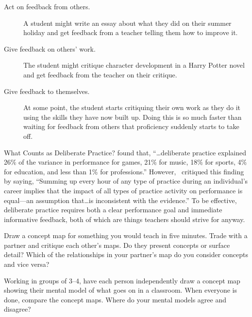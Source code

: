 \begin{description}

\item[Act on feedback from others.]
  A student might write an essay about what they did on their summer holiday
  and get feedback from a teacher telling them how to improve it.

\item[Give feedback on others' work.]
  The student might critique character development in a Harry Potter novel
  and get feedback from the teacher on their critique.

\item[Give feedback to themselves.]
  At some point,
  the student starts critiquing their own work as they do it
  using the skills they have now built up.
  Doing this is so much faster than waiting for feedback from others
  that proficiency suddenly starts to take off.

\end{description}

\begin{aside}{What Counts as Deliberate Practice?}
  \cite{Macn2014} found that,
  ``{\ldots}deliberate practice explained 26\% of the variance in performance for games,
  21\% for music,
  18\% for sports,
  4\% for education,
  and less than 1\% for professions.''
  However,~\cite{Eric2016} critiqued this finding by saying,
  ``Summing up every hour of any type of practice during an individual's career
  implies that the impact of all types of practice activity on performance is equal---an assumption
  that{\ldots}is inconsistent with the evidence.''
  To be effective,
  deliberate practice requires both a clear performance goal
  and immediate informative feedback,
  both of which are things teachers should strive for anyway.
\end{aside}



Draw a concept map for something you would teach in five minutes.
Trade with a partner and critique each other's maps.
Do they present concepts or surface detail?
Which of the relationships in your partner's map do you consider concepts and vice versa?


Working in groups of 3--4,
have each person independently draw a concept map showing their mental model of what goes on in a classroom.
When everyone is done,
compare the concept maps.
Where do your mental models agree and disagree?

